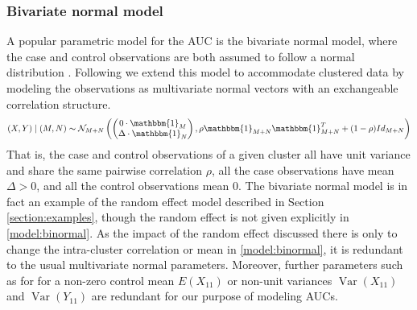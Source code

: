 \documentclass[12pt]{article}
\DeclareMathOperator{\V}{Var}
\DeclareMathOperator{\corr}{Corr}
\newcommand{\E}{E}
\newcommand{\comment}[1]{
  \iftoggle{commenttoggle}{
    {\normalsize{\color{red}{ #1}}\normalsize}
  }
  {}
}
\begin{document}
\subsubsection{Bivariate normal model}
A popular parametric model for the AUC is the bivariate normal model, where
the case and control observations are both assumed to follow a normal
distribution \citep{hanley1988}. Following \citet{obuchowski1997} we
extend this model to accommodate clustered data by modeling the
observations as multivariate normal vectors with an exchangeable
correlation structure.
\begin{align}
  (X,Y) \mid (M,N) \sim \mathcal{N}_{M+N}\left(
    \begin{pmatrix}0\cdot\mathbbm{1}_M\\ \Delta\cdot\mathbbm{1}_N\end{pmatrix},
  \rho\mathbbm{1}_{M+N}\mathbbm{1}_{M+N}^T + (1-\rho)Id_{M+N}
  \right)\label{model:binormal}
\end{align}
That is, the case and control observations of a given cluster all have
unit variance and share the same pairwise correlation $\rho$, all the case observations have mean $\Delta>0$,
and all the control observations mean $0$. The bivariate normal model is in fact an
example of the random effect model described in Section
\ref{section:examples}, though the random effect is not given explicitly in \eqref{model:binormal}. As the impact of the random effect discussed there is only to
change the intra-cluster correlation or mean in \eqref{model:binormal}, it is redundant
to the usual multivariate normal parameters. %
Moreover, further parameters such as for %
for a non-zero control mean $\E(X_{11})$ or non-unit
variances $\V(X_{11})$ and $\V(Y_{11})$ are
redundant for our purpose of modeling AUCs.%
\end{document}
